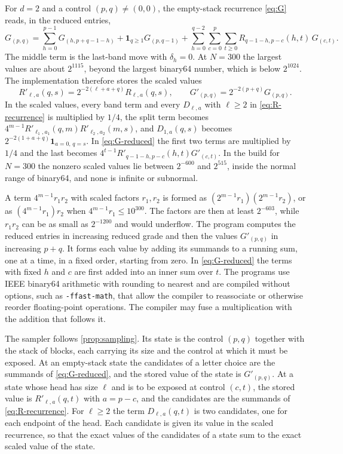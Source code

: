 \documentclass[11pt,reqno]{amsart}
\theoremstyle{definition}
\theoremstyle{remark}
\newcommand{\one}{\mathbf 1}
\begin{document}
For $d=2$ and a control $(p,q)\neq(0,0)$, the empty-stack recurrence
\eqref{eq:G} reads, in the reduced entries,
\begin{equation}\label{eq:G-reduced}
G_{(p,q)}=\sum_{h=0}^{p-1}G_{(h,p+q-1-h)}
 +\one_{q\geq1}G_{(p,q-1)}
 +\sum_{h=0}^{q-2}\sum_{c=0}^{p}\sum_{t\geq0}R_{q-1-h,p-c}(h,t)\,G_{(c,t)}.
\end{equation}
The middle term is the last-band move with $\delta_h=0$.  At $N=300$ the
largest values are about $2^{1115}$, beyond the largest binary64 number,
which is below $2^{1024}$.  The implementation therefore stores the scaled
values
\[
 R'_{\ell,a}(q,s)=2^{-2(\ell+a+q)}R_{\ell,a}(q,s),
 \qquad
 G'_{(p,q)}=2^{-2(p+q)}G_{(p,q)}.
\]
In the scaled values, every band term and every $D_{\ell,a}$ with
$\ell\geq2$ in \eqref{eq:R-recurrence} is multiplied by $1/4$, the split
term becomes
$4^{m-1}R'_{\ell_1,a_1}(q,m)R'_{\ell_2,a_2}(m,s)$, and $D_{1,a}(q,s)$ becomes
$2^{-2(1+a+q)}\one_{a=0,\,q=s}$.  In \eqref{eq:G-reduced} the first two terms
are multiplied by $1/4$ and the last becomes
$4^{t-1}R'_{q-1-h,p-c}(h,t)G'_{(c,t)}$.  In the build for $N=300$ the nonzero
scaled values lie between $2^{-600}$ and $2^{515}$, inside the normal range
of binary64, and none is infinite or subnormal.

A term $4^{m-1}r_1r_2$ with scaled factors $r_1,r_2$ is formed as
$(2^{m-1}r_1)(2^{m-1}r_2)$, or as $(4^{m-1}r_1)r_2$ when
$4^{m-1}r_1\leq10^{300}$.  The factors are then at least $2^{-603}$, while
$r_1r_2$ can be as small as $2^{-1200}$ and would underflow.  The program computes the reduced
entries in increasing reduced grade and then the values $G'_{(p,q)}$ in
increasing $p+q$.  It forms each value by adding its summands to a running
sum, one at a time, in a fixed order, starting from zero.  In
\eqref{eq:G-reduced} the terms with fixed $h$ and $c$ are first added into
an inner sum over $t$.  The programs use IEEE binary64 arithmetic with
rounding to nearest and are compiled without options, such as
\texttt{-ffast-math}, that allow the compiler to reassociate or otherwise
reorder floating-point operations.  The compiler may fuse a multiplication
with the addition that follows it.

The sampler follows \cref{prop:sampling}.  Its state is the control $(p,q)$
together with the stack of blocks, each carrying its size and the
control at which it must be exposed.  At an empty-stack state the candidates
of a letter choice are the summands of \eqref{eq:G-reduced}, and the stored
value of the state is $G'_{(p,q)}$.  At a state whose head has size $\ell$
and is to be exposed at control $(c,t)$, the stored value is
$R'_{\ell,a}(q,t)$ with $a=p-c$, and the candidates are the summands of
\eqref{eq:R-recurrence}.  For $\ell\geq2$ the term $D_{\ell,a}(q,t)$ is two
candidates, one for each endpoint of the head.  Each candidate is given its
value in the scaled recurrence, so that the exact values of the candidates
of a state sum to the exact scaled value of the state.
\end{document}
